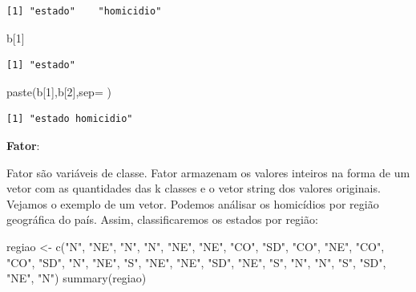 \documentclass[
  letterpaper,
  DIV=11,
  numbers=noendperiod]{scrreprt}
\newenvironment{Shaded}{\begin{snugshade}}{\end{snugshade}}
\newcommand{\AttributeTok}[1]{\textcolor[rgb]{0.40,0.45,0.13}{#1}}
\newcommand{\DecValTok}[1]{\textcolor[rgb]{0.68,0.00,0.00}{#1}}
\newcommand{\FunctionTok}[1]{\textcolor[rgb]{0.28,0.35,0.67}{#1}}
\newcommand{\NormalTok}[1]{\textcolor[rgb]{0.00,0.23,0.31}{#1}}
\newcommand{\OtherTok}[1]{\textcolor[rgb]{0.00,0.23,0.31}{#1}}
\newcommand{\StringTok}[1]{\textcolor[rgb]{0.13,0.47,0.30}{#1}}
\begin{document}
\begin{verbatim}
[1] "estado"    "homicidio"
\end{verbatim}

\begin{Shaded}
\begin{Highlighting}[]
\NormalTok{b[}\DecValTok{1}\NormalTok{]}
\end{Highlighting}
\end{Shaded}

\begin{verbatim}
[1] "estado"
\end{verbatim}

\begin{Shaded}
\begin{Highlighting}[]
\FunctionTok{paste}\NormalTok{(b[}\DecValTok{1}\NormalTok{],b[}\DecValTok{2}\NormalTok{],}\AttributeTok{sep=}\StringTok{\textquotesingle{} \textquotesingle{}}\NormalTok{)}
\end{Highlighting}
\end{Shaded}

\begin{verbatim}
[1] "estado homicidio"
\end{verbatim}

\textbf{Fator}:

Fator são variáveis de classe. Fator armazenam os valores inteiros na
forma de um vetor com as quantidades das k classes e o vetor string dos
valores originais. Vejamos o exemplo de um vetor. Podemos análisar os
homicídios por região geográfica do país. Assim, classificaremos os
estados por região:

\begin{Shaded}
\begin{Highlighting}[]
\NormalTok{regiao }\OtherTok{\textless{}{-}} \FunctionTok{c}\NormalTok{(}\StringTok{"N"}\NormalTok{,  }\StringTok{"NE"}\NormalTok{,  }\StringTok{"N"}\NormalTok{,  }\StringTok{"N"}\NormalTok{,  }\StringTok{"NE"}\NormalTok{,  }\StringTok{"NE"}\NormalTok{,  }\StringTok{"CO"}\NormalTok{,  }\StringTok{"SD"}\NormalTok{,  }\StringTok{"CO"}\NormalTok{,  }\StringTok{"NE"}\NormalTok{,  }\StringTok{"CO"}\NormalTok{,  }\StringTok{"CO"}\NormalTok{,  }\StringTok{"SD"}\NormalTok{,  }\StringTok{"N"}\NormalTok{,  }\StringTok{"NE"}\NormalTok{,  }\StringTok{"S"}\NormalTok{,  }\StringTok{"NE"}\NormalTok{,  }\StringTok{"NE"}\NormalTok{,  }\StringTok{"SD"}\NormalTok{,  }\StringTok{"NE"}\NormalTok{,  }\StringTok{"S"}\NormalTok{,  }\StringTok{"N"}\NormalTok{,  }\StringTok{"N"}\NormalTok{,  }\StringTok{"S"}\NormalTok{,  }\StringTok{"SD"}\NormalTok{,  }\StringTok{"NE"}\NormalTok{,  }\StringTok{"N"}\NormalTok{)}
\FunctionTok{summary}\NormalTok{(regiao)}
\end{Highlighting}
\end{Shaded}
\end{document}
